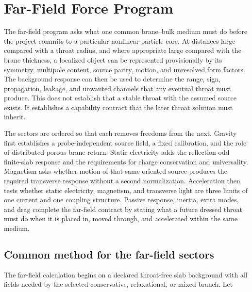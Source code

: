 
\chapter{Far-Field Force Program}
\label{ch:far-field-force-program}

The far-field program asks what one common brane--bulk medium must do before the
project commits to a particular nonlinear particle core. At distances large
compared with a throat radius, and where appropriate large compared with the
brane thickness, a localized object can be represented provisionally by its
symmetry, multipole content, source parity, motion, and unresolved form factors.
The background response can then be used to determine the range, sign,
propagation, leakage, and unwanted channels that any eventual throat must
produce. This does not establish that a stable throat with the assumed source
exists. It establishes a capability contract that the later throat solution
must inherit.

The sectors are ordered so that each removes freedoms from the next. Gravity
first establishes a probe-independent source field, a fixed calibration, and
the role of distributed porous-brane return. Static electricity adds the reflection-odd
finite-slab response and the requirements for charge conservation and
universality. Magnetism asks whether motion of that same oriented source
produces the required transverse response without a second normalization.
Acceleration then tests whether static electricity, magnetism, and transverse
light are three limits of one current and one coupling structure. Passive
response, inertia, extra modes, and drag complete the far-field contract by
stating what a future dressed throat must do when it is placed in, moved
through, and accelerated within the same medium.

\section{Common method for the far-field sectors}

The far-field calculation begins on a declared throat-free slab background with
all fields needed by the selected conservative, relaxational, or mixed branch.
Let

